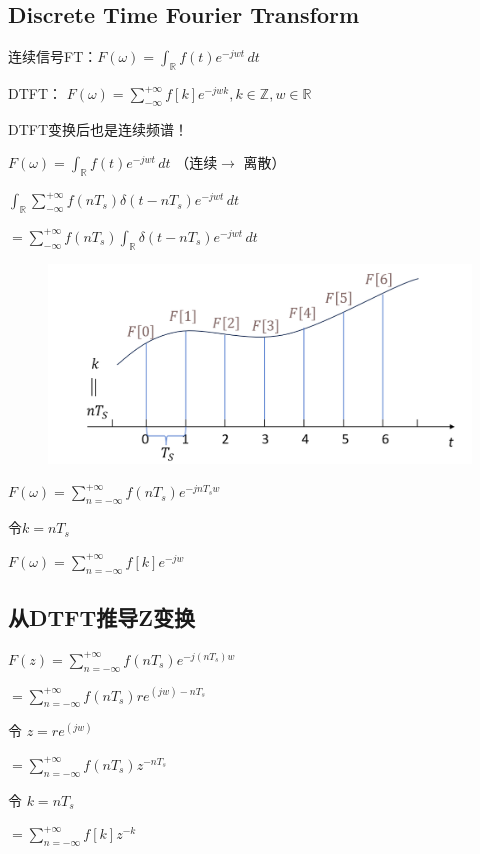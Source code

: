 \documentclass[UTF8]{ctexart}
\begin{document}
\subsection{Discrete Time Fourier Transform}
连续信号FT：$F(\omega )=\int_{\mathbb{R} }f(t)e^{-jwt} \,dt $  \par
DTFT： $F(\omega )=\sum_{-\infty }^{+\infty} f[k]e^{-jwk},k\in \mathbb{Z},w\in \mathbb{R} $  \par
DTFT变换后也是连续频谱！\par
$F(\omega )=\int_{\mathbb{R} }f(t)e^{-jwt} \,dt $ （连续$\longrightarrow $ 离散） \par
$\int_{\mathbb{R} }\sum_{-\infty }^{+\infty} f(nT_s)\delta (t-nT_s)e^{-jwt} \,dt $ \par
$=\sum_{-\infty }^{+\infty} f(nT_s)\int_{\mathbb{R} }\delta (t-nT_s)e^{-jwt} \,dt $ \par
\begin{figure}[h]
    \centering         %
    \includegraphics[scale=0.38]{3.png}
\end{figure}
$F(\omega )=\sum_{n=-\infty }^{+\infty} f(nT_s)e^{-jnT_sw}$ \par 
令$k=nT_s$ \par 
$F(\omega )=\sum_{n=-\infty }^{+\infty} f[k]e^{-jw}$ \par 
\subsection{从DTFT推导Z变换}
$F(z )=\sum_{n=-\infty }^{+\infty} f(nT_s)e^{-j(nT_s)w}$ \par 
\qquad $=\sum_{n=-\infty }^{+\infty} f(nT_s)re^{(jw)-nT_s}$ \par 
令 $z=re^{(jw)}$ \par 
\qquad $=\sum_{n=-\infty }^{+\infty} f(nT_s)z^{-nT_s}$ \par
令 $k=nT_s$ \par 
\qquad $=\sum_{n=-\infty }^{+\infty} f[k]z^{-k}$ \par
\end{document}

